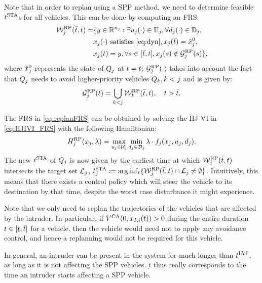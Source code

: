 Note that in order to replan using a SPP method, we need to determine feasible $t^\text{STA}$s for all vehicles. This can be done by computing an FRS:
\begin{equation} \label{eq:replanFRS}
\begin{aligned} 
\frs_j^{\text{RP}}(\tea, t) = & \{y \in \R^{n_j}: \exists \ctrl_j(\cdot) \in \cfset_j, \forall \dstb_j(\cdot) \in \dfset_j, \\
& \state_j(\cdot) \text{ satisfies \eqref{eq:dyn}}, \state_j(\tea) = \tilde{\state}_j^0, \\
& \state_j(t) = y, \forall s \in [\tea, t], \state_j(s) \notin \obsset_j^{\text{RP}}(s) \},
\end{aligned}
\end{equation}
where $\tilde{x}_j^0$ represents the state of $Q_j$ at $t = \bar{t}$; $\mathcal{G}_j^{\text{RP}}(\cdot)$ takes into account the fact that $Q_j$ needs to avoid higher-priority vehicles $Q_k, k<j$ and is given by:
\begin{equation} 
\mathcal{G}_j^{\text{RP}}(t) = \bigcup_{k<j} \mathcal{W}_k^{\text{RP}}(\bar{t}, t), ~~~t > \bar{t}.
\end{equation}

The FRS in \eqref{eq:replanFRS} can be obtained by solving the HJ VI in \eqref{eq:HJIVI_FRS} with the following Hamiltonian:
\begin{equation}
H_j^{\text{RP}}(x_j, \lambda) = \max_{u_j \in \mathcal{U}_j} \min_{d_j \in \mathcal{D}_j} \lambda \cdot f_j (x_j, u_j, d_j). 
\end{equation} 
The new $t^\text{STA}$ of $Q_j$ is now given by the earliest time at which $\mathcal{W}_j^{\text{RP}}(\bar{t}, t)$ intersects the target set $\mathcal{L}_j$, $t^\text{STA}_j := \arg \inf_t \{ \mathcal{W}_j^{\text{RP}}(\bar{t}, t) \cap \mathcal{L}_j \neq \emptyset \}$. Intuitively, this means that there exists a control policy which will steer the vehicle to its destination by that time, despite the worst case disturbance it might experience.

\begin{remark}
Note that we only need to replan the trajectories of the vehicles that are affected by the intruder. In particular, if $V^{\text{CA}}(0, x_{I, i}(t)) > 0$ during the entire duration $t \in [\underline{t}, \bar{t}]$ for a vehicle, then the vehicle would need not to apply any avoidance control, and hence a replanning would not be required for this vehicle. 
\end{remark}

\begin{remark}
In general, an intruder can be present in the system for much longer than $t^\text{IAT}$, as long as it is not affecting the SPP vehicles. $\underbar{t}$ thus really corresponds to the time an intruder starts affecting a SPP vehicle.
\end{remark}


